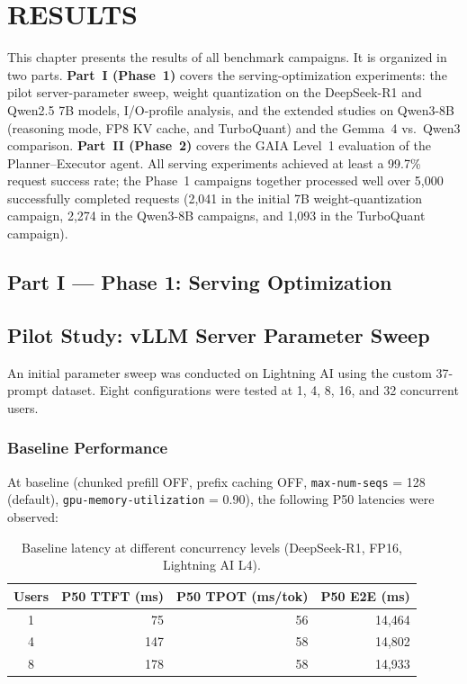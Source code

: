 \documentclass[a4paper,12pt]{report}
\begin{document}
\chapter{RESULTS}

This chapter presents the results of all benchmark campaigns. It is organized in two parts. \textbf{Part~I (Phase~1)} covers the serving-optimization experiments: the pilot server-parameter sweep, weight quantization on the DeepSeek-R1 and Qwen2.5 7B models, I/O-profile analysis, and the extended studies on Qwen3-8B (reasoning mode, FP8 KV cache, and TurboQuant) and the Gemma~4 vs.\ Qwen3 comparison. \textbf{Part~II (Phase~2)} covers the GAIA Level~1 evaluation of the Planner--Executor agent. All serving experiments achieved at least a 99.7\% request success rate; the Phase~1 campaigns together processed well over 5{,}000 successfully completed requests (2{,}041 in the initial 7B weight-quantization campaign, 2{,}274 in the Qwen3-8B campaigns, and 1{,}093 in the TurboQuant campaign).

\section*{Part I --- Phase 1: Serving Optimization}

\section{Pilot Study: vLLM Server Parameter Sweep}

An initial parameter sweep was conducted on Lightning AI using the custom 37-prompt dataset. Eight configurations were tested at 1, 4, 8, 16, and 32 concurrent users.

\subsection{Baseline Performance}

At baseline (chunked prefill OFF, prefix caching OFF, \texttt{max-num-seqs} = 128 (default), \texttt{gpu-memory-utilization} = 0.90), the following P50 latencies were observed:

\begin{table}[h!]
\caption{Baseline latency at different concurrency levels (DeepSeek-R1, FP16, Lightning AI L4).}
\centering
\begin{tabular}{|c|r|r|r|}
\hline
\textbf{Users} & \textbf{P50 TTFT (ms)} & \textbf{P50 TPOT (ms/tok)} & \textbf{P50 E2E (ms)} \\
\hline
1 & 75 & 56 & 14{,}464 \\
\hline
4 & 147 & 58 & 14{,}802 \\
\hline
8 & 178 & 58 & 14{,}933 \\
\hline
\end{tabular}
\label{table:baseline}
\end{table}
\end{document}
